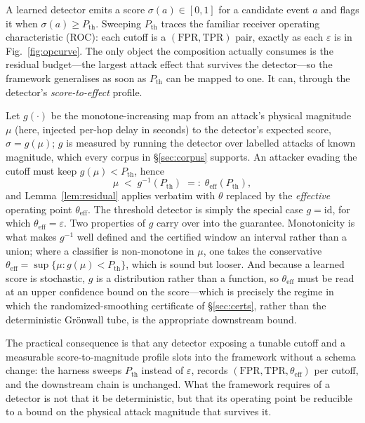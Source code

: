 A learned detector emits a score $\sigma(a)\in[0,1]$ for a candidate event $a$
and flags it when $\sigma(a)\ge P_{\mathrm{th}}$. Sweeping $P_{\mathrm{th}}$
traces the familiar receiver operating characteristic (ROC): each cutoff is a
$(\mathrm{FPR},\mathrm{TPR})$ pair, exactly as each $\varepsilon$ is in
Fig.~\ref{fig:opcurve}. The only object the composition actually consumes is the
residual budget---the largest attack effect that survives the detector---so the
framework generalises as soon as $P_{\mathrm{th}}$ can be mapped to one. It can,
through the detector's \emph{score-to-effect} profile.

Let $g(\cdot)$ be the monotone-increasing map from an attack's physical
magnitude $\mu$ (here, injected per-hop delay in seconds) to the detector's
expected score, $\sigma=g(\mu)$; $g$ is measured by running the detector over
labelled attacks of known magnitude, which every corpus in \S\ref{sec:corpus}
supports. An attacker evading the cutoff must keep $g(\mu)<P_{\mathrm{th}}$,
hence
\begin{equation}
\label{eq:pth}
\mu \;<\; g^{-1}(P_{\mathrm{th}}) \;=:\; \theta_{\mathrm{eff}}(P_{\mathrm{th}}),
\end{equation}
and Lemma~\ref{lem:residual} applies verbatim with $\theta$ replaced by the
\emph{effective} operating point $\theta_{\mathrm{eff}}$. The threshold detector
is simply the special case $g=\mathrm{id}$, for which
$\theta_{\mathrm{eff}}=\varepsilon$. Two properties of $g$ carry over into the
guarantee. Monotonicity is what makes $g^{-1}$ well defined and the certified
window an interval rather than a union; where a classifier is non-monotone in
$\mu$, one takes the conservative
$\theta_{\mathrm{eff}}=\sup\{\mu: g(\mu)<P_{\mathrm{th}}\}$, which is sound but
looser. And because a learned score is stochastic, $g$ is a distribution rather
than a function, so $\theta_{\mathrm{eff}}$ must be read at an upper confidence
bound on the score---which is precisely the regime in which the
randomized-smoothing certificate of \S\ref{sec:certs}, rather than the
deterministic Gr\"onwall tube, is the appropriate downstream bound.

The practical consequence is that any detector exposing a tunable cutoff and a
measurable score-to-magnitude profile slots into the framework without a schema
change: the harness sweeps $P_{\mathrm{th}}$ instead of $\varepsilon$, records
$(\mathrm{FPR},\mathrm{TPR},\theta_{\mathrm{eff}})$ per cutoff, and the
downstream chain is unchanged. What the framework requires of a detector is not
that it be deterministic, but that its operating point be reducible to a bound
on the physical attack magnitude that survives it.

